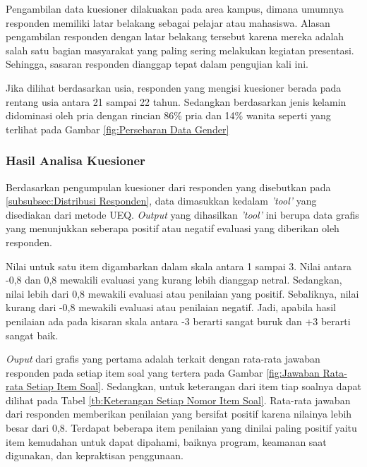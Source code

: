 Pengambilan data kuesioner dilakuakan pada area kampus, dimana umumnya responden memiliki latar belakang sebagai pelajar atau mahasiswa. Alasan pengambilan responden dengan latar belakang tersebut karena mereka adalah salah satu bagian masyarakat yang paling sering melakukan kegiatan presentasi. Sehingga, sasaran responden dianggap tepat dalam pengujian kali ini. 

Jika dilihat berdasarkan usia, responden yang mengisi kuesioner berada pada rentang usia antara 21 sampai 22 tahun. Sedangkan berdasarkan jenis kelamin didominasi oleh pria dengan rincian 86\% pria dan 14\% wanita seperti yang terlihat pada Gambar \ref{fig:Persebaran Data Gender}  


\subsubsection{Hasil Analisa Kuesioner}
\label{subsubsec:Hasil Analisa Kuesioner}

Berdasarkan pengumpulan kuesioner dari responden yang disebutkan pada \ref{subsubsec:Distribusi Responden}, data dimasukkan kedalam \emph{'tool'} yang disediakan dari metode UEQ. \emph{Output} yang dihasilkan \emph{'tool'} ini berupa data grafis yang menunjukkan seberapa positif atau negatif evaluasi yang diberikan oleh responden. 

Nilai untuk satu item digambarkan dalam skala antara 1 sampai 3. Nilai antara -0,8 dan 0,8 mewakili evaluasi yang kurang lebih dianggap netral. Sedangkan, nilai lebih dari 0,8 mewakili evaluasi atau penilaian yang positif. Sebaliknya, nilai kurang dari -0,8 mewakili evaluasi atau penilaian negatif. Jadi, apabila hasil penilaian ada pada kisaran skala antara -3 berarti sangat buruk dan +3 berarti sangat baik. 

\emph{Ouput} dari grafis yang pertama adalah terkait dengan rata-rata jawaban responden pada setiap item soal yang tertera pada Gambar \ref{fig:Jawaban Rata-rata Setiap Item Soal}. Sedangkan, untuk keterangan dari item tiap soalnya dapat dilihat pada Tabel \ref{tb:Keterangan Setiap Nomor Item Soal}. Rata-rata jawaban dari responden memberikan penilaian yang bersifat positif karena nilainya lebih besar dari 0,8. Terdapat beberapa item penilaian yang dinilai paling positif yaitu item kemudahan untuk dapat dipahami, baiknya program, keamanan saat digunakan, dan kepraktisan penggunaan. 

